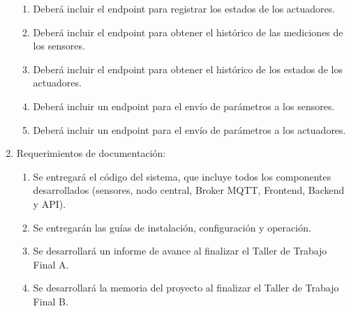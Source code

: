 \begin{enumerate}
\begin{enumerate}
		      \item Deberá incluir el endpoint para registrar los estados de los actuadores.
		      \item Deberá incluir el endpoint para obtener el histórico de las mediciones de los
		            sensores.
		      \item Deberá incluir el endpoint para obtener el histórico de los estados de los
		            actuadores.
		      \item Deberá incluir un endpoint para el envío de parámetros a los sensores.
		      \item Deberá incluir un endpoint para el envío de parámetros a los actuadores.

	      \end{enumerate}

	\item Requerimientos de documentación:
	      \begin{enumerate}
		      \item Se entregará el código del sistema, que incluye todos los componentes
		            desarrollados (sensores, nodo central, Broker MQTT, Frontend, Backend y API).
		      \item Se entregarán las guías de instalación, configuración y operación.
		      \item Se desarrollará un informe de avance al finalizar el Taller de Trabajo Final A.
		      \item Se desarrollará la memoria del proyecto al finalizar el Taller de Trabajo Final
		            B.
	      \end{enumerate}
\end{enumerate}
